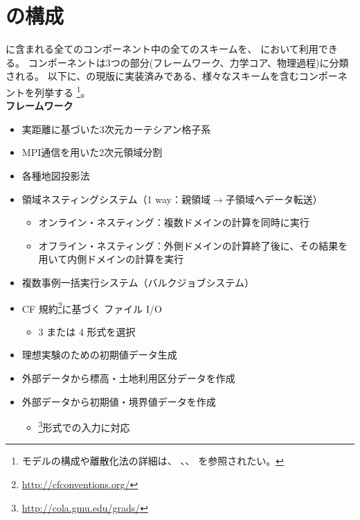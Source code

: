 \section{\scalerm の構成}  \label{subsec:sturcture_scale_rm}
\scalelib に含まれる全てのコンポーネント中の全てのスキームを、
\scalerm において利用できる。
コンポーネントは3つの部分(フレームワーク、力学コア、物理過程)に分類される。
以下に、\scalerm の現版に実装済みである、様々なスキームを含むコンポーネントを列挙する%
\footnote{
モデルの構成や離散化法の詳細は、
\citet{scale_2015}、\citet{satoy_2015b}、
\citet{nishizawa_2015}を参照されたい。
}。
\\

{\bf フレームワーク}
\begin{itemize}
 \item 実距離に基づいた3次元カーテシアン格子系
 \item MPI通信を用いた2次元領域分割
 \item 各種地図投影法
 \item 領域ネスティングシステム（1 way：親領域$\to$子領域へデータ転送）
   \begin{itemize}
    \item オンライン・ネスティング：複数ドメインの計算を同時に実行
    \item オフライン・ネスティング：外側ドメインの計算終了後に、その結果を用いて内側ドメインの計算を実行
   \end{itemize}
 \item 複数事例一括実行システム（バルクジョブシステム）
 \item CF 規約\footnote{\url{http://cfconventions.org/}}に基づく \netcdf ファイル I/O
   \begin{itemize}
   \item {\netcdf}3 または {\netcdf}4 形式を選択
   \end{itemize}
 \item 理想実験のための初期値データ生成
 \item 外部データから標高・土地利用区分データを作成
 \item 外部データから初期値・境界値データを作成
   \begin{itemize}
    \item
      \grads \footnote{\url{http://cola.gmu.edu/grads/}}形式での入力に対応
   \end{itemize}
\end{itemize}

